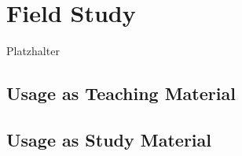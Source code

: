 \section{Field Study}
Platzhalter\\

\subsection{Usage as Teaching Material}
\subsection{Usage as Study Material}


\newpage
